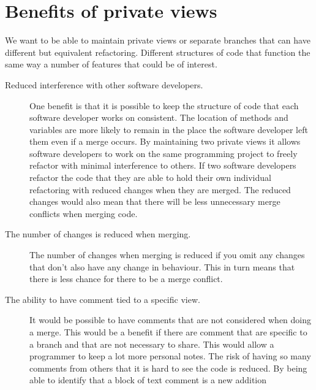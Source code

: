 
\section{Benefits of private views}
We want to be able to maintain private views or separate branches that can have different but equivalent refactoring. Different structures of code that function the same way a number of features that could be of interest.

\begin{description}

\item [Reduced interference with other software developers.]   
One benefit is that it is possible to keep the structure of code that each software developer works on consistent.  The location of methods and variables are more likely to remain in the place the software developer left them even if a merge occurs.
By maintaining two private views it allows software developers to work on the same programming project to freely refactor with minimal interference to others.
If two software developers refactor the code that they are able to hold their own individual refactoring with reduced changes when they are merged.
The reduced changes would also mean that there will be less unnecessary merge conflicts when merging code.
  
\item [The number of changes is reduced when merging.] 
The number of changes when merging is reduced if you omit any changes that don't also have any change in behaviour.  This in turn means that there is less chance for there to be a merge conflict.
  
\item [The ability to have comment tied to a specific view.] 
It would be possible to have comments that are not considered when doing a merge. This would be a benefit if there are comment that are specific to a branch and that are not necessary to share.  This would allow a programmer to keep a lot more personal notes.  The risk of having so many comments from others that it is hard to see the code is reduced. By being able to identify that a block of text comment is a new addition

\end{description}

